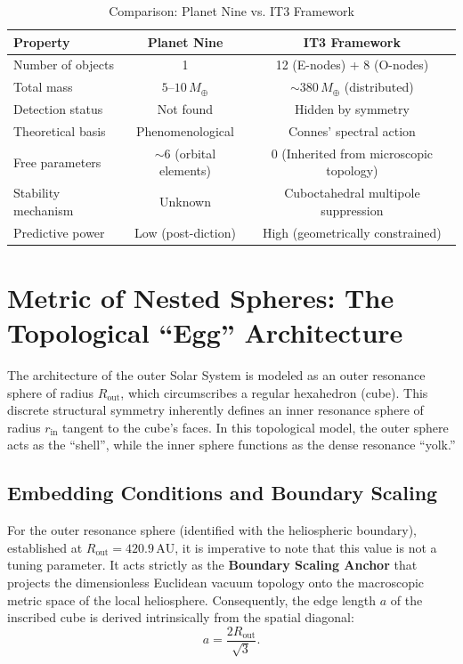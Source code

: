 \documentclass[11pt,a4paper]{article}
\theoremstyle{remark}
\newcommand{\AU}{\,\mathrm{AU}}
\newcommand{\Mearth}{\,M_\oplus}
\begin{document}
\begin{table}[htbp]
\centering
\caption{Comparison: Planet Nine vs. IT3 Framework}
\label{tab:comparison}
\begin{tabular}{lcc}
\toprule
\textbf{Property} & \textbf{Planet Nine} & \textbf{IT3 Framework} \\
\midrule
Number of objects & 1 & 12 (E-nodes) + 8 (O-nodes) \\
Total mass & $5$--$10\Mearth$ & $\sim 380\Mearth$ (distributed) \\
Detection status & Not found & Hidden by symmetry \\
Theoretical basis & Phenomenological & Connes' spectral action \cite{logvinovich2026} \\
Free parameters & $\sim 6$ (orbital elements) & $0$ (Inherited from microscopic topology) \\
Stability mechanism & Unknown & Cuboctahedral multipole suppression \\
Predictive power & Low (post-diction) & High (geometrically constrained) \\
\bottomrule
\end{tabular}
\end{table}

\section{Metric of Nested Spheres: The Topological ``Egg'' Architecture}

The architecture of the outer Solar System is modeled as an outer resonance sphere of radius $R_{\text{out}}$, which circumscribes a regular hexahedron (cube). This discrete structural symmetry inherently defines an inner resonance sphere of radius $r_{\text{in}}$ tangent to the cube's faces. In this topological model, the outer sphere acts as the ``shell'', while the inner sphere functions as the dense resonance ``yolk.''

\subsection{Embedding Conditions and Boundary Scaling}

For the outer resonance sphere (identified with the heliospheric boundary), established at $R_{\text{out}} = 420.9\AU$, it is imperative to note that this value is not a tuning parameter. It acts strictly as the \textbf{Boundary Scaling Anchor} that projects the dimensionless Euclidean vacuum topology onto the macroscopic metric space of the local heliosphere. Consequently, the edge length $a$ of the inscribed cube is derived intrinsically from the spatial diagonal:
\begin{equation}
    a = \frac{2R_{\text{out}}}{\sqrt{3}}.
    \label{eq:cube_edge}
\end{equation}
\end{document}
